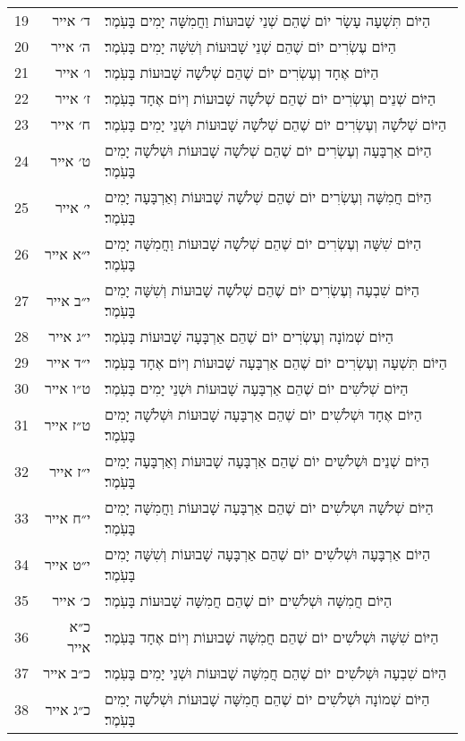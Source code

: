 \documentclass[twoside, openany, parskip=half, 11pt]{book}
\begin{document}
\begin{scriptsize}
\begin{longtable}{ l | r | p{} }
19 & ד׳ אייר & הַיּוֹם תִּשְׁעָה עָשָׂר יוֹם שֶׁהֵם שְׁנֵי שָׁבוּעוֹת וַחֲמִשָּׁה יָמִים בָּעֹֽמֶר׃ \\
20 & ה׳ אייר & הַיּוֹם עֶשְׂרִים יוֹם שֶׁהֵם שְׁנֵי שָׁבוּעוֹת וְשִׁשָּׁה יָמִים בָּעֹֽמֶר׃ \\
21 & ו׳ אייר & הַיּוֹם אֶחָד וְעֶשְׂרִים יוֹם שֶׁהֵם שְׁלֹשָׁה שָׁבוּעוֹת בָּעֹֽמֶר׃ \\
22 & ז׳ אייר & הַיּוֹם שְׁנֵים וְעֶשְׂרִים יוֹם שֶׁהֵם שְׁלֹשָׁה שָׁבוּעוֹת וְיוֹם אֶחָד בָּעֹֽמֶר׃ \\
23 & ח׳ אייר & הַיּוֹם שְׁלֹשָׁה וְעֶשְׂרִים יוֹם שֶׁהֵם שְׁלֹשָׁה שָׁבוּעוֹת וּשְׁנֵי יָמִים בָּעֹֽמֶר׃ \\
24 & ט׳ אייר & הַיּוֹם אַרְבָּעָה וְעֶשְׂרִים יוֹם שֶׁהֵם שְׁלֹשָׁה שָׁבוּעוֹת וּשְׁלֹשָׁה יָמִים בָּעֹֽמֶר׃ \\
25 & י׳ אייר & הַיּוֹם חֲמִשָּׁה וְעֶשְׂרִים יוֹם שֶׁהֵם שְׁלֹשָׁה שָׁבוּעוֹת וְאַרְבָּעָה יָמִים בָּעֹֽמֶר׃ \\
26 & י״א אייר & הַיּוֹם שִׁשָּׁה וְעֶשְׂרִים יוֹם שֶׁהֵם שְׁלֹשָׁה שָׁבוּעוֹת וַחֲמִשָּׁה יָמִים בָּעֹֽמֶר׃ \\
27 & י״ב אייר & הַיּוֹם שִׁבְעָה וְעֶשְׂרִים יוֹם שֶׁהֵם שְׁלֹשָׁה שָׁבוּעוֹת וְשִׁשָּׁה יָמִים בָּעֹֽמֶר׃ \\
28 & י״ג אייר & הַיּוֹם שְׁמוֹנָה וְעֶשְׂרִים יוֹם שֶׁהֵם אַרְבָּעָה שָׁבוּעוֹת בָּעֹֽמֶר׃ \\
29 & י״ד אייר & הַיּוֹם תִּשְׁעָה וְעֶשְׂרִים יוֹם שֶׁהֵם אַרְבָּעָה שָׁבוּעוֹת וְיוֹם אֶחָד בָּעֹֽמֶר׃ \\
30 & ט״ו אייר & הַיּוֹם שְׁלֹשִׁים יוֹם שֶׁהֵם אַרְבָּעָה שָׁבוּעוֹת וּשְׁנֵי יָמִים בָּעֹֽמֶר׃ \\
31 & ט״ז אייר & הַיּוֹם אֶחָד וּשְׁלֹשִׁים יוֹם שֶׁהֵם אַרְבָּעָה שָׁבוּעוֹת וּשְׁלֹשָׁה יָמִים בָּעֹֽמֶר׃ \\
32 & י״ז אייר & הַיּוֹם שְׁנֵים וּשְׁלֹשִׁים יוֹם שֶׁהֵם אַרְבָּעָה שָׁבוּעוֹת וְאַרְבָּעָה יָמִים בָּעֹֽמֶר׃ \\
33 & י״ח אייר & הַיּוֹם שְׁלֹשָׁה וּשְלֹשִׁים יוֹם שֶׁהֵם אַרְבָּעָה שָׁבוּעוֹת וַחֲמִשָּׁה יָמִים בָּעֹֽמֶר׃ \\
34 & י״ט אייר & הַיּוֹם אַרְבָּעָה וּשְׁלֹשִׁים יוֹם שֶׁהֵם אַרְבָּעָה שָׁבוּעוֹת וְשִׁשָּׁה יָמִים בָּעֹֽמֶר׃ \\
35 & כ׳ אייר & הַיּוֹם חֲמִשָּׁה וּשְׁלֹשִׁים יוֹם שֶׁהֵם חֲמִשָּׁה שָׁבוּעוֹת בָּעֹֽמֶר׃ \\
36 & כ״א אייר & הַיּוֹם שִׁשָּׁה וּשְׁלֹשִׁים יוֹם שֶׁהֵם חֲמִשָּׁה שָׁבוּעוֹת וְיוֹם אֶחָד בָּעֹֽמֶר׃ \\
37 & כ״ב אייר & הַיּוֹם שִׁבְעָה וּשְׁלֹשִׁים יוֹם שֶׁהֵם חֲמִשָּׁה שָׁבוּעוֹת וּשְׁנֵי יָמִים בָּעֹֽמֶר׃ \\
38 & כ״ג אייר & הַיּוֹם שְׁמוֹנָה וּשְׁלֹשִׁים יוֹם שֶׁהֵם חֲמִשָּׁה שָׁבוּעוֹת וּשְׁלֹשָׁה יָמִים בָּעֹֽמֶר׃ \\

\end{longtable}
\end{scriptsize}
\end{document}
